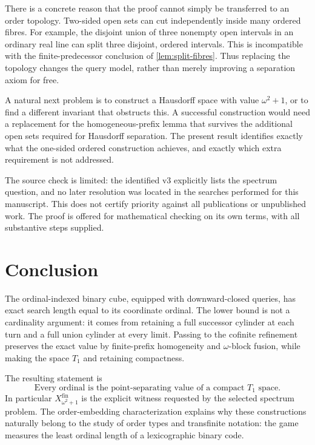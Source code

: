 \documentclass[11pt,a4paper]{article}
\theoremstyle{definition}
\theoremstyle{remark}
\newcommand{\fin}{\mathrm{fin}}
\begin{document}
There is a concrete reason that the proof cannot simply be transferred to an
order topology. Two-sided open sets can cut independently inside many ordered
fibres. For example, the disjoint union of three nonempty open intervals in an
ordinary real line can split three disjoint, ordered intervals. This is
incompatible with the finite-predecessor conclusion of \cref{lem:split-fibres}.
Thus replacing the topology changes the query model, rather than merely
improving a separation axiom for free.

A natural next problem is to construct a Hausdorff space with value
$\omega^2+1$, or to find a different invariant that obstructs this. A successful
construction would need a replacement for the homogeneous-prefix lemma that
survives the additional open sets required for Hausdorff separation. The present
result identifies exactly what the one-sided ordered construction achieves,
and exactly which extra requirement is not addressed.

The source check is limited: the identified v3 explicitly lists the spectrum
question, and no later resolution was located in the searches performed for
this manuscript. This does not certify priority against all publications or
unpublished work. The proof is offered for mathematical checking on its own
terms, with all substantive steps supplied.

\section{Conclusion}

The ordinal-indexed binary cube, equipped with downward-closed queries, has
exact search length equal to its coordinate ordinal. The lower bound is not a
cardinality argument: it comes from retaining a full successor cylinder at each
turn and a full union cylinder at every limit. Passing to the cofinite refinement
preserves the exact value by finite-prefix homogeneity and $\omega$-block fusion,
while making the space $T_1$ and retaining compactness.

The resulting statement is
\[
 \boxed{\text{Every ordinal is the point-separating value of a compact }T_1
 \text{ space.}}
\]
In particular $X_{\omega^2+1}^\fin$ is the explicit witness requested by the
selected spectrum problem. The order-embedding characterization explains why
these constructions naturally belong to the study of order types and
transfinite notation: the game measures the least ordinal length of a
lexicographic binary code.
\end{document}
